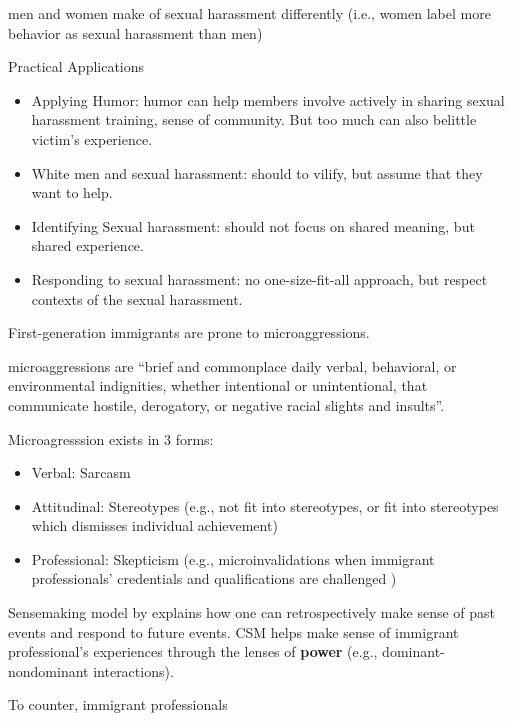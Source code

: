 \documentclass[
]{book}
\providecommand{\tightlist}{%
  \setlength{\itemsep}{0pt}\setlength{\parskip}{0pt}}
\begin{document}
men and women make of sexual harassment differently (i.e., women label more behavior as sexual harassment than men)

Practical Applications

\begin{itemize}
\tightlist
\item
  Applying Humor: humor can help members involve actively in sharing sexual harassment training, sense of community.
  But too much can also belittle victim's experience.
\item
  White men and sexual harassment: should to vilify, but assume that they want to help.
\item
  Identifying Sexual harassment: should not focus on shared meaning, but shared experience.
\item
  Responding to sexual harassment: no one-size-fit-all approach, but respect contexts of the sexual harassment.
\end{itemize}

\citep{Shenoy_Packer_2014}

First-generation immigrants are prone to microaggressions.

microaggressions are ``brief and commonplace daily verbal, behavioral, or environmental indignities, whether intentional
or unintentional, that communicate hostile, derogatory, or negative racial slights and insults''. \citep{Sue_2007}

Microagresssion exists in 3 forms:

\begin{itemize}
\tightlist
\item
  Verbal: Sarcasm
\item
  Attitudinal: Stereotypes (e.g., not fit into stereotypes, or fit into stereotypes which dismisses individual
  achievement)\\
\item
  Professional: Skepticism (e.g., microinvalidations when immigrant professionals' credentials and qualifications are
  challenged )
\end{itemize}

Sensemaking model by \citep{Weick_1995} explains how one can retrospectively make sense of past events and respond to future
events. CSM helps make sense of immigrant professional's experiences through the lenses of \textbf{power} (e.g.,
dominant-nondominant interactions).

To counter, immigrant professionals
\end{document}
